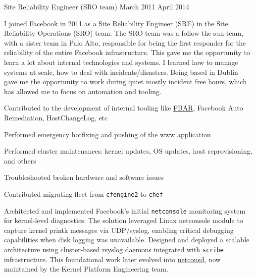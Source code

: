 \begin{cventries}
  \cventryprevrole
  {Site Reliability Engineer (SRO team)}
  {
    March 2011 \newline April 2014
  }
  {
    I joined Facebook in 2011 as a Site Reliability Engineer (SRE) in the Site Reliability Operations (SRO) team.
    The SRO team was a follow the sun team, with a sister team in Palo Alto, responsible for being the first
    responder for the reliability of the entire Facebook infrastructure.
    This gave me the opportunity to learn a lot about internal technologies and systems.
    I learned how to manage systems at scale, how to deal with incidents/disasters.
    Being based in Dublin gave me the opportunity to work during quiet mostly incident free hours, which has allowed
    me to focus on automation and tooling.
    \vspace{2mm}
    \begin{cvitems}
      \item {Contributed to the development of internal tooling like \href{https://engineering.fb.com/2011/09/15/data-center-engineering/making-facebook-self-healing/}{FBAR}, Facebook Auto Remediation, HostChangeLog, etc}
      \item {Performed emergency hotfixing and pushing of the www application}
      \item {Performed cluster maintenances: kernel updates, OS updates, host reprovisioning, and others}
      \item {Troubleshooted broken hardware and software issues}
      \item {Contributed migrating fleet from \texttt{cfengine2} to \texttt{chef}}
      \item {Architected and implemented Facebook's initial \texttt{netconsole} monitoring system for kernel-level diagnostics.
                  The solution leveraged Linux netconsole module to capture kernel printk messages via UDP/syslog, enabling critical
                  debugging capabilities when disk logging was unavailable. Designed and deployed a scalable architecture using
                  cluster-based rsyslog daemons integrated with \texttt{scribe} infrastructure. This foundational work later evolved
                  into \href{https://github.com/facebook/netconsd}{netconsd}, now maintained by the Kernel Platform Engineering team.}
    \end{cvitems}
  }


\end{cventries}
